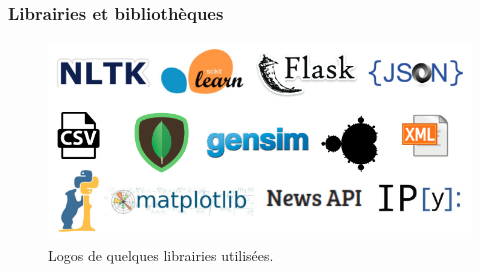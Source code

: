         \subsubsection{Librairies et bibliothèques}
            \begin{figure}[h]
                    \centering
                    \includegraphics[height=150pt,width=320pt]{img/chapter4/tools/tools.png}
                    \caption{Logos de quelques librairies utilisées.}
                    \label{}
            \end{figure}
